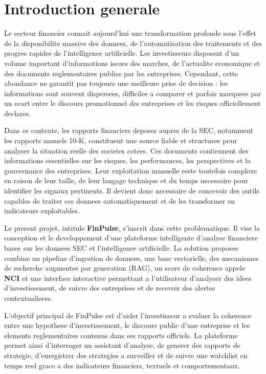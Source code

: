 \chapter*{Introduction generale}

Le secteur financier connait aujourd'hui une transformation profonde sous l'effet de
la disponibilite massive des donnees, de l'automatisation des traitements et des
progres rapides de l'intelligence artificielle. Les investisseurs disposent d'un
volume important d'informations issues des marches, de l'actualite economique et des
documents reglementaires publies par les entreprises. Cependant, cette abondance ne
garantit pas toujours une meilleure prise de decision : les informations sont souvent
dispersees, difficiles a comparer et parfois marquees par un ecart entre le discours
promotionnel des entreprises et les risques officiellement declares.

Dans ce contexte, les rapports financiers deposes aupres de la SEC, notamment les
rapports annuels 10-K, constituent une source fiable et structuree pour analyser la
situation reelle des societes cotees. Ces documents contiennent des informations
essentielles sur les risques, les performances, les perspectives et la gouvernance des
entreprises. Leur exploitation manuelle reste toutefois complexe en raison de leur
taille, de leur langage technique et du temps necessaire pour identifier les signaux
pertinents. Il devient donc necessaire de concevoir des outils capables de traiter ces
donnees automatiquement et de les transformer en indicateurs exploitables.

Le present projet, intitule \textbf{FinPulse}, s'inscrit dans cette problematique. Il
vise la conception et le developpement d'une plateforme intelligente d'analyse
financiere basee sur les donnees SEC et l'intelligence artificielle. La solution
proposee combine un pipeline d'ingestion de donnees, une base vectorielle, des
mecanismes de recherche augmentee par generation (RAG), un score de coherence appele
\textbf{NCI} et une interface interactive permettant a l'utilisateur d'analyser des
idees d'investissement, de suivre des entreprises et de recevoir des alertes
contextualisees.

L'objectif principal de FinPulse est d'aider l'investisseur a evaluer la coherence
entre une hypothese d'investissement, le discours public d'une entreprise et les
elements reglementaires contenus dans ses rapports officiels. La plateforme permet
ainsi d'interroger un assistant d'analyse, de generer des rapports de strategie,
d'enregistrer des strategies a surveiller et de suivre une watchlist en temps reel
grace a des indicateurs financiers, textuels et comportementaux.

